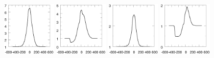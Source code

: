 \documentclass{article}
\begin{document}
\begin{figure}
    \includegraphics[width=0.24\textwidth]{profHa3wind306090}
    \includegraphics[width=0.24\textwidth]{profHa3wind303060}
    \includegraphics[width=0.24\textwidth]{profHb3wind306090}    
    \includegraphics[width=0.24\textwidth]{profHb3wind303060}
    

\end{figure}
\end{document}
